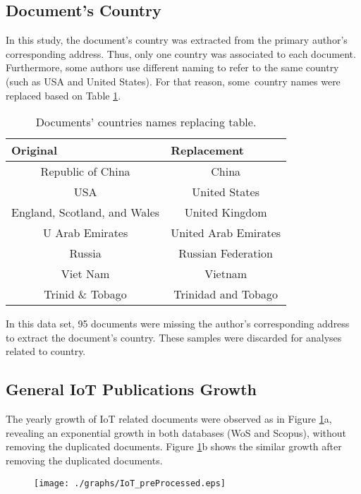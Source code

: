 \documentclass[symmetry,article,accept,moreauthors,pdftex10pt,a4paper]{mdpi}
\begin{document}
\subsection{Document's Country}

In this study, the document's country was extracted from the primary author's corresponding address. Thus, only one country was associated to each document. Furthermore, some authors use different naming to refer to the same country (such as USA and United States). For that reason, some~country names were replaced based on Table \ref{table_countries_rep}.

\begin{table}[H]
	\centering
	\caption{Documents' countries names replacing table.}
	\label{table_countries_rep}
	\begin{tabular}{cc}
		\toprule
		\multicolumn{1}{l}{\textbf{Original}} & \multicolumn{1}{l}{\textbf{Replacement}} \\
		\midrule
		Republic of China & China \\
		USA & United States \\
		England, Scotland, and Wales & United Kingdom \\
		U Arab Emirates & United Arab Emirates \\
		Russia & Russian Federation \\
		Viet Nam & Vietnam \\
		Trinid \& Tobago & Trinidad and Tobago\\
		\bottomrule
	\end{tabular}
\end{table}

In this data set, 95 documents were missing the author's corresponding address to extract the document's country. These samples were discarded for analyses related to country.

\subsection{General IoT Publications Growth}

The yearly growth of IoT related documents were observed as in Figure \ref{fig_database}a, revealing an exponential growth in both databases (WoS and Scopus), without removing the duplicated documents. Figure \ref{fig_database}b shows the similar growth after removing the duplicated documents.  

\begin{figure}[h]
	\centering
	\texttt{[image: ./graphs/IoT\_preProcessed.eps]}
	\label{fig_database}
\end{figure}
\end{document}
